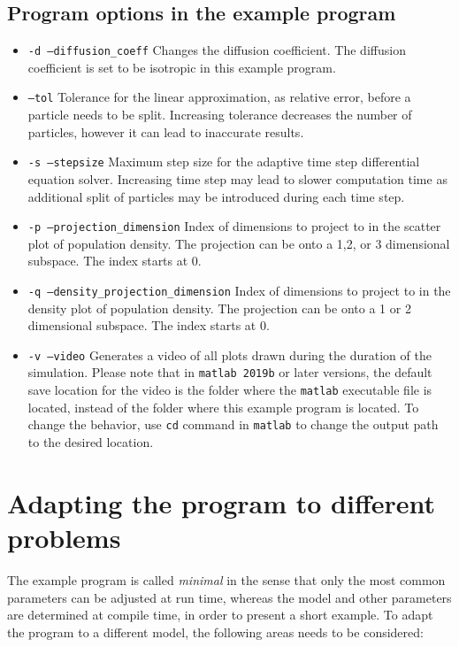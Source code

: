 \documentclass[10pt]{article} %
\begin{document}
\subsection{Program options in the example program}
\begin{itemize}
\item
\texttt{-d --diffusion\_coeff}
Changes the diffusion coefficient. The diffusion coefficient is set to be isotropic in this example program.
\item
\texttt{--tol} 
Tolerance for the linear approximation, as relative error, before a particle needs to be split. Increasing tolerance decreases the number of particles, however it can lead to inaccurate results. 
\item
\texttt{-s --stepsize} Maximum step size for the adaptive time step differential equation solver. Increasing time step may lead to slower computation time as additional split of particles may be introduced during each time step.
\item
\texttt{-p --projection\_dimension}
Index of dimensions to project to in the scatter plot of population density. The projection can be onto a 1,2, or 3 dimensional subspace. The index starts at 0.
\item
\texttt{-q --density\_projection\_dimension}
Index of dimensions to project to in the density plot of population density. The projection can be onto a 1 or 2 dimensional subspace. The index starts at 0.
\item
\texttt{-v --video}
Generates a video of all plots drawn during the duration of the simulation. Please note that in \texttt{matlab 2019b} or later versions, the default save location for the video is the folder where the \texttt{matlab} executable file is located, instead of the folder where this example program is located. To change the behavior, use \texttt{cd} command in \texttt{matlab} to change the output path to the desired location.
\end{itemize}
\section{Adapting the program to different problems}
The example program is called \emph{minimal} in the sense that only the most common parameters can be adjusted at run time, whereas the model and other parameters are determined at compile time, in order to present a short example. To adapt the program to a different model, the following areas needs to be considered: 
\end{document}
